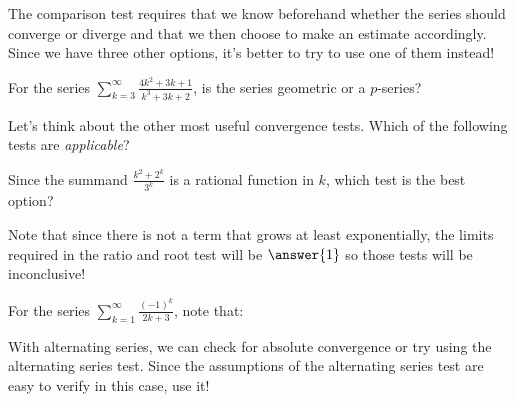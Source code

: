\documentclass{ximera}
\begin{document}
\begin{exercise}
\begin{hint}
\begin{question}
The comparison test requires that we know beforehand whether the series should converge or diverge and that we then choose to make an estimate accordingly.  Since we have three other options, it's better to try to use one of them instead! 
\end{question}



\begin{question}
For the series $\sum_{k=3}^{\infty} \frac{4k^2+3k+1}{k^3+3k+2}$, is the series geometric or a $p$-series?

\begin{multipleChoice}
\end{multipleChoice}

Let's think about the other most useful convergence tests.  Which of the following tests are \emph{applicable}?

\begin{selectAll}
\end{selectAll}

Since the summand $ \frac{k^2+2^k}{3^k}$ is a rational function in $k$, which test is the best option?
\begin{selectAll}
\end{selectAll}
Note that since there is not a term that grows at least exponentially, the limits required in the ratio and root test will be $\answer{1}$ so those tests will be inconclusive!


\end{question}

\begin{question}
For the series $\sum_{k=1}^{\infty} \frac{(-1)^k}{2k+3}$, note that:

\begin{multipleChoice}
\end{multipleChoice}

With alternating series, we can check for absolute convergence or try using the alternating series test.  Since the assumptions of the alternating series test are easy to verify in this case, use it!


\end{question}
\end{hint}
\end{exercise}
\end{document}
